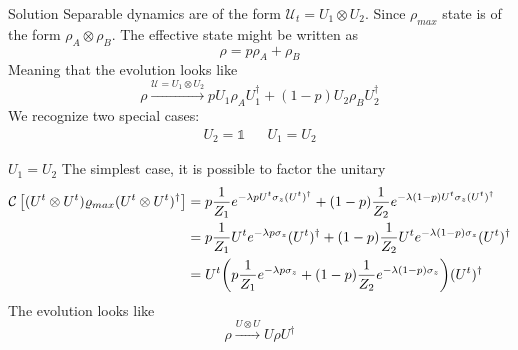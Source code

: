 \documentclass{cubeamer}
\newcommand{\mcU}{\mathcal{U}}
\newcommand{\mcC}{\mathcal{C}}
\newcommand{\Id}{\mathds{1}}%
\newcommand{\CG}[1]{\mcC\left[#1\right]}
\begin{document}
\begin{frame}{Solution}
    Separable dynamics are of the form $\mcU_{t}=U_{1}\otimes U_{2}$. Since $\rho_{max}$ state is of the form $\rho_{A}\otimes\rho_{B}$. The effective state might be written as 
    \begin{equation*}
        \rho=p\rho_{A}+\rho_{B}
    \end{equation*}
    Meaning that the evolution looks like
    \begin{equation*}
        \rho\xrightarrow{\mcU=U_{1}\otimes U_{2}} pU_{1}\rho_{A}U_{1}^{\dag}+(1-p)U_{2}\rho_{B}U_{2}^{\dag}
    \end{equation*}
    We recognize two special cases:
    \begin{align*}
        U_{2}=\Id&&U_{1}=U_{2}
    \end{align*}
\end{frame}

\begin{frame}{$U_{1}=U_{2}$}
    The simplest case, it is possible to factor the unitary
    \begin{align*}
    \CG{(U^{t}\otimes U^{t})\varrho_{max}(U^{t}\otimes U^{t})^{\dag}}&=p\frac{1}{Z_{1}}e^{-\lambda p U^{t}\sigma_{z}(U^t)^{\dag}}+(1-p)\frac{1}{Z_{2}}e^{-\lambda (1-p)U^{t}\sigma_{z}(U^t)^{\dag}}\\
    &=p\frac{1}{Z_{1}}U^{t}e^{-\lambda p \sigma_{z}}(U^t)^{\dag}+(1-p)\frac{1}{Z_{2}}U^{t}e^{-\lambda (1-p)\sigma_{z}}(U^t)^{\dag}\\
    &=U^{t}\qty(p\frac{1}{Z_{1}}e^{-\lambda p \sigma_{z}}+(1-p)\frac{1}{Z_{2}}e^{-\lambda (1-p)\sigma_{z}})(U^t)^{\dag}\\
    \end{align*}
    The evolution looks like
    \begin{equation}
        \rho\xrightarrow{U\otimes U}U\rho U^{\dagger}
    \end{equation}
\end{frame}
\end{document}

